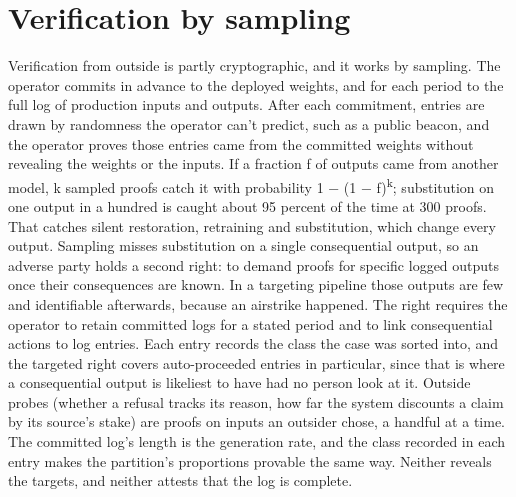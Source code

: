 \section{Verification by sampling}
\label{sec:13.5}
Verification from outside is partly cryptographic, and it works by sampling. The operator commits in advance to the deployed weights, and for each period to the full log of production inputs and outputs. After each commitment, entries are drawn by randomness the operator can't predict, such as a public beacon, and the operator proves those entries came from the committed weights without revealing the weights or the inputs. If a fraction f of outputs came from another model, k sampled proofs catch it with probability 1 − (1 − f)\textsuperscript{k}; substitution on one output in a hundred is caught about 95 percent of the time at 300 proofs. That catches silent restoration, retraining and substitution, which change every output. Sampling misses substitution on a single consequential output, so an adverse party holds a second right: to demand proofs for specific logged outputs once their consequences are known. In a targeting pipeline those outputs are few and identifiable afterwards, because an airstrike happened. The right requires the operator to retain committed logs for a stated period and to link consequential actions to log entries. Each entry records the class the case was sorted into, and the targeted right covers auto-proceeded entries in particular, since that is where a consequential output is likeliest to have had no person look at it. Outside probes (whether a refusal tracks its reason, how far the system discounts a claim by its source's stake) are proofs on inputs an outsider chose, a handful at a time. The committed log's length is the generation rate, and the class recorded in each entry makes the partition's proportions provable the same way. Neither reveals the targets, and neither attests that the log is complete.

